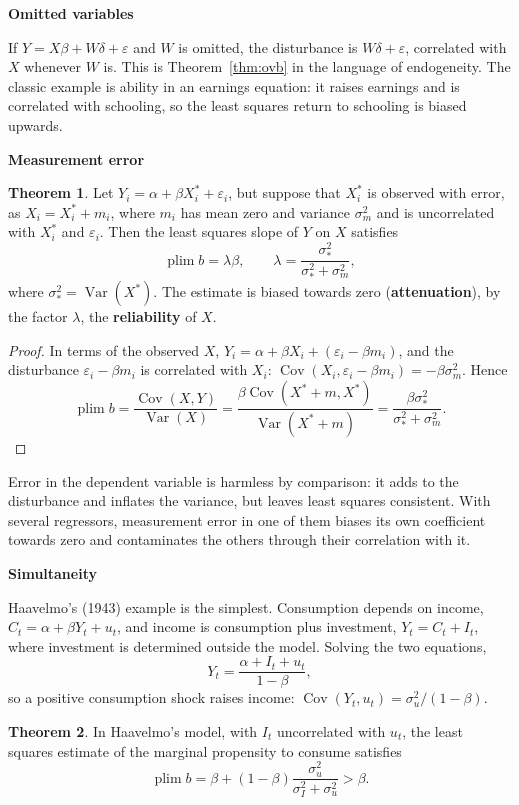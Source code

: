 \documentclass[11pt,a4paper]{article}
\numberwithin{equation}{section}
\DeclareMathOperator{\Var}{Var}
\DeclareMathOperator{\Cov}{Cov}
\DeclareMathOperator{\plim}{plim}
\theoremstyle{definition}
\newtheorem{thm}{Theorem}[subsection]
\newcommand{\subhead}[1]{%
  \par\medskip\noindent\textbf{#1}\par\nobreak\smallskip}
\begin{document}
\subhead{Omitted variables}
If $Y = X\beta + W\delta + \varepsilon$ and $W$ is omitted, the disturbance is $W\delta + \varepsilon$, correlated with $X$ whenever $W$ is. This is Theorem~\ref{thm:ovb} in the language of
endogeneity. The classic example is ability in an earnings equation: it raises earnings and is correlated with schooling, so the least squares
return to schooling is biased upwards.

\subhead{Measurement error}

\begin{thm}
\label{thm:atten}
Let $Y_i = \alpha + \beta X_i^* + \varepsilon_i$, but suppose that $X_i^*$ is observed with error, as $X_i = X_i^* + m_i$, where $m_i$ has mean zero and variance $\sigma_m^2$ and is
uncorrelated with $X_i^*$ and $\varepsilon_i$. Then the least squares slope of $Y$ on $X$ satisfies
\[
\plim b = \lambda\beta, \qquad \lambda = \frac{\sigma_*^2}{\sigma_*^2 + \sigma_m^2} ,
\]
where $\sigma_*^2 = \Var(X^*)$. The estimate is biased towards zero (\textbf{attenuation}), by the factor $\lambda$, the \textbf{reliability} of $X$.
\end{thm}

\begin{proof}
In terms of the observed $X$, $Y_i = \alpha + \beta X_i + (\varepsilon_i - \beta m_i)$, and the disturbance $\varepsilon_i - \beta m_i$ is correlated with $X_i$: $\Cov(X_i, \varepsilon_i - \beta m_i) = -\beta\sigma_m^2$.
Hence
\[
\plim b = \frac{\Cov(X, Y)}{\Var(X)} = \frac{\beta\Cov(X^* + m, X^*)}{\Var(X^* + m)} = \frac{\beta\sigma_*^2}{\sigma_*^2 + \sigma_m^2} .
\]
\end{proof}

Error in the dependent variable is harmless by comparison: it adds to the disturbance and inflates the variance, but leaves least squares consistent.
With several regressors, measurement error in one of them biases its own coefficient towards zero and contaminates the others through their
correlation with it.

\subhead{Simultaneity}
Haavelmo's (1943) example is the simplest. Consumption depends on income, $C_t = \alpha + \beta Y_t + u_t$, and income is consumption plus investment,
$Y_t = C_t + I_t$, where investment is determined outside the model. Solving the two equations,
\[
Y_t = \frac{\alpha + I_t + u_t}{1 - \beta} ,
\]
so a positive consumption shock raises income: $\Cov(Y_t, u_t) = \sigma_u^2/(1 - \beta)$.

\begin{thm}
\label{thm:haavelmo}
In Haavelmo's model, with $I_t$ uncorrelated with $u_t$, the least squares estimate of the marginal propensity to consume satisfies
\[
\plim b = \beta + (1 - \beta)\frac{\sigma_u^2}{\sigma_I^2 + \sigma_u^2} > \beta .
\]
\end{thm}
\end{document}
